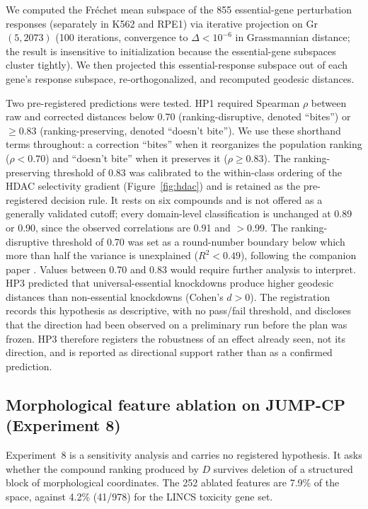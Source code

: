 \documentclass[11pt]{article}
\begin{document}
We computed the Fr\'echet mean subspace of the 855 essential-gene
perturbation responses (separately in K562 and RPE1) via iterative
projection on Gr$(5, 2073)$ (100 iterations, convergence to
$\Delta < 10^{-6}$ in Grassmannian distance; the result is insensitive
to initialization because the essential-gene subspaces cluster tightly).
We then projected this essential-response subspace out of each gene's
response subspace, re-orthogonalized, and recomputed geodesic distances.

Two pre-registered predictions were tested.
HP1 required Spearman $\rho$ between raw and corrected distances below
0.70 (ranking-disruptive, denoted ``bites'') or $\geq 0.83$
(ranking-preserving, denoted ``doesn't bite''). We use these shorthand
terms throughout: a correction ``bites'' when it reorganizes the
population ranking ($\rho < 0.70$) and ``doesn't bite'' when it
preserves it ($\rho \geq 0.83$). The ranking-preserving threshold of
0.83 was calibrated to the within-class ordering of the HDAC selectivity
gradient (Figure~\ref{fig:hdac}) and is retained as the pre-registered
decision rule. It rests on six compounds and is not offered as a generally
validated cutoff; every domain-level classification is unchanged at 0.89
or 0.90, since the observed correlations are 0.91 and $>$0.99. The ranking-disruptive threshold of 0.70 was set as a
round-number boundary below which more than half the variance is
unexplained ($R^2 < 0.49$), following the companion paper
\citep{tower2026drug}. Values between 0.70 and 0.83 would require
further analysis to interpret.
HP3 predicted that universal-essential knockdowns produce higher geodesic
distances than non-essential knockdowns (Cohen's $d > 0$). The registration
records this hypothesis as descriptive, with no pass/fail threshold, and
discloses that the direction had been observed on a preliminary run before
the plan was frozen. HP3 therefore registers the robustness of an effect
already seen, not its direction, and is reported as directional support
rather than as a confirmed prediction.

\subsection{Morphological feature ablation on JUMP-CP (Experiment 8)}

Experiment~8 is a sensitivity analysis and carries no registered hypothesis.
It asks whether the compound ranking produced by $D$ survives deletion of a
structured block of morphological coordinates. The 252 ablated features are
7.9\% of the space, against 4.2\% (41/978) for the LINCS toxicity gene set.
\end{document}
